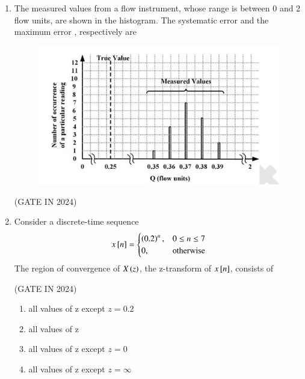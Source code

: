 \documentclass[journal,12pt,onecolumn]{IEEEtran}
\theoremstyle{remark}
\begin{document}
\begin{enumerate}
    \item The measured values from a flow instrument, whose range is between 0 and 2 flow units, are shown in the histogram. The systematic error  and the maximum error , respectively are
    \begin{figure}[H]
        \centering
        \includegraphics[width=0.9\columnwidth]{figs/p17.jpg}
        \caption*{}
        \label{fig:p17}
    \end{figure}

    \hfill{(GATE IN 2024)}
    \begin{enumerate}
    \end{enumerate}
    
    \item Consider a discrete-time sequence
    \begin{align*}
        x{}\left[n\right] = 
        \begin{cases}
            \left(0.2\right)^n, & 0 \leq n \leq 7 \\
            0, & \text{otherwise}
        \end{cases}
    \end{align*}
    The region of convergence of $X\left(z\right)$, the z-transform of $x{}\left[n\right]$, consists of
    
    \hfill{(GATE IN 2024)}
    \begin{enumerate}
        \item all values of z except $z = 0.2$
        \item all values of z
        \item all values of z except $z = 0$
        \item all values of z except $z = \infty$
    \end{enumerate}


\end{enumerate}
\end{document}
